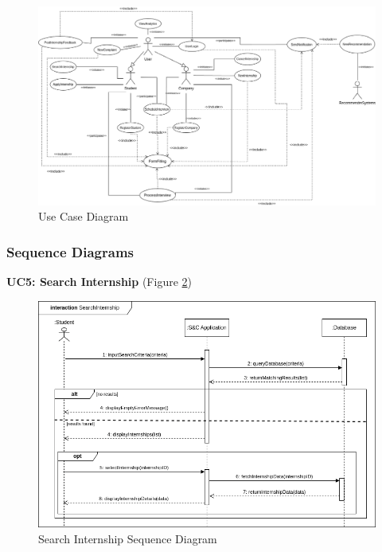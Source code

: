 \begin{figure}[H]
\centering
\includegraphics[width=\textwidth]{Images/use_case_diagram.png}
\caption{\label{fig:use-case-diagram} Use Case Diagram}
\end{figure}

\clearpage
\subsubsection{Sequence Diagrams}

\textbf{UC5: Search Internship} (Figure \ref{fig:search_sequence})
\begin{figure}[H]
\centering
\includegraphics[width=\textwidth]{Images/searchInternship_sequence.png}
\caption{\label{fig:search_sequence} Search Internship Sequence Diagram}
\end{figure}

